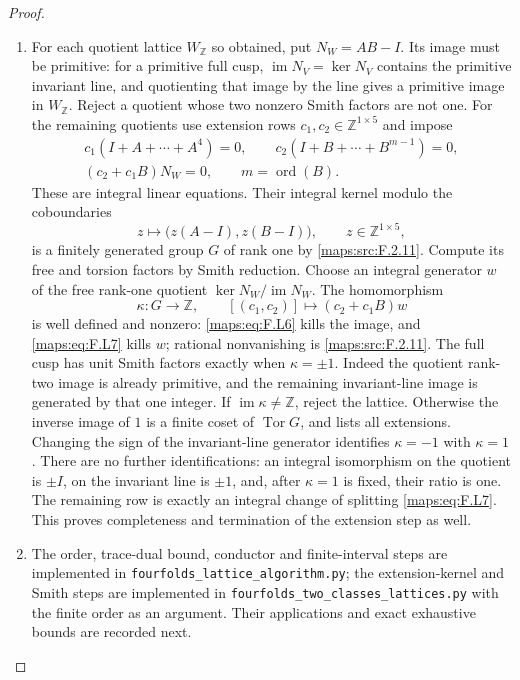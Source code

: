 \documentclass[11pt,a4paper]{article}
\theoremstyle{definition}
\begin{document}
\begin{proof}
\begin{enumerate}[label=\arabic*.]
\item For each quotient lattice $W_{\mathbb Z}$ so obtained,
put $N_W=AB-I$.
Its image must be primitive: for a primitive full cusp,
$\operatorname{im}N_V=\ker N_V$ contains the primitive
invariant line, and quotienting that image by the line
gives a primitive image in $W_{\mathbb Z}$.
Reject a quotient whose two nonzero Smith factors are
not one.  For the remaining quotients use extension rows
$c_1,c_2\in\mathbb Z^{1\times5}$ and impose
\[
\begin{gathered}
 c_1(I+A+\cdots+A^4)=0,
 \qquad c_2(I+B+\cdots+B^{m-1})=0,\\
 (c_2+c_1B)N_W=0,
 \qquad m=\operatorname{ord}(B).
\end{gathered}
 \tag{F.L6}\label{maps:eq:F.L6}
\]
These are integral linear equations.  Their integral kernel
modulo the coboundaries
\[
 z\longmapsto\bigl(z(A-I),z(B-I)\bigr),
 \qquad z\in\mathbb Z^{1\times5},
 \tag{F.L7}\label{maps:eq:F.L7}
\]
is a finitely generated group $G$ of rank one by \ref{maps:src:F.2.11}.
Compute its free and torsion factors by Smith reduction.
Choose an integral generator $w$ of the free rank-one
quotient $\ker N_W/\operatorname{im}N_W$.
The homomorphism
\[
 \kappa:G\longrightarrow\mathbb Z,
 \qquad [(c_1,c_2)]\longmapsto(c_2+c_1B)w
 \tag{F.L8}\label{maps:eq:F.L8}
\]
is well defined and nonzero: \eqref{maps:eq:F.L6} kills the image, and
\eqref{maps:eq:F.L7} kills $w$; rational nonvanishing is \ref{maps:src:F.2.11}.
The full cusp has unit Smith factors exactly when
$\kappa=\pm1$.
Indeed the quotient rank-two image is already primitive,
and the remaining invariant-line image is generated by
that one integer.
If $\operatorname{im}\kappa\ne\mathbb Z$, reject the
lattice.  Otherwise the inverse image of $1$ is a finite
coset of $\operatorname{Tor}G$, and lists all extensions.
Changing the sign of the invariant-line generator identifies
$\kappa=-1$ with $\kappa=1$.
There are no further identifications: an integral isomorphism
on the quotient is $\pm I$, on the invariant line is
$\pm1$, and, after $\kappa=1$ is fixed, their ratio is one.
The remaining row is exactly an integral change of splitting
\eqref{maps:eq:F.L7}.
This proves completeness and termination of the extension
step as well.

\item The order, trace-dual bound, conductor and finite-interval
steps are implemented in
\texttt{fourfolds\_lattice\_algorithm.py};
the extension-kernel and Smith steps are implemented in
\texttt{fourfolds\_two\_classes\_lattices.py} with the
finite order as an argument.  Their applications and exact
exhaustive bounds are recorded next.

\end{enumerate}
\end{proof}
\end{document}
